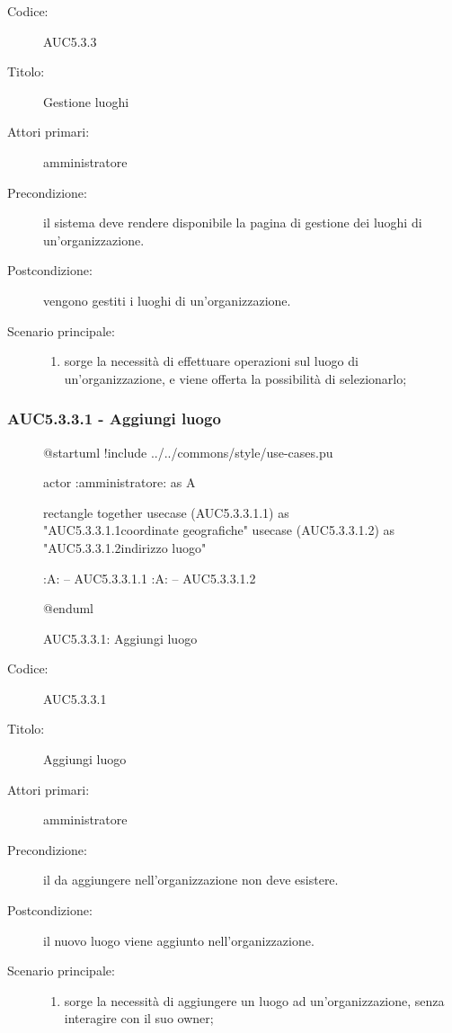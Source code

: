 \documentclass[../../../analisi-dei-requisiti.tex]{subfiles}
\begin{document}
\begin{description}
  \item[Codice:] AUC5.3.3
  \item[Titolo:] Gestione luoghi
  \item[Attori primari:] amministratore
  \item[Precondizione:] il sistema deve rendere disponibile la pagina di gestione dei luoghi di un'organizzazione.
  \item[Postcondizione:] vengono gestiti i luoghi di un'organizzazione.
  \item[Scenario principale:]
  \begin{enumerate}
    \item sorge la necessità di effettuare operazioni sul luogo di un'organizzazione, e viene offerta la possibilità di selezionarlo;
  \end{enumerate}
\end{description}

\subsubsection{AUC5.3.3.1 - Aggiungi luogo}%
\label{subs:AUC5.3.3.1}

\begin{figure}[H]
  \centering
  \begin{plantuml}
  @startuml
  !include ../../commons/style/use-cases.pu

  actor :amministratore: as A

  rectangle {
    together {
      usecase (AUC5.3.3.1.1) as "AUC5.3.3.1.1\nInserisci coordinate geografiche"
      usecase (AUC5.3.3.1.2) as "AUC5.3.3.1.2\nInserisci indirizzo luogo"
    }
  }

  :A: -- AUC5.3.3.1.1
  :A: -- AUC5.3.3.1.2

  @enduml
  \end{plantuml}
  \caption{AUC5.3.3.1: Aggiungi luogo}
  \label{fig:AUC5_3_3_1}
\end{figure}

\begin{description}
  \item[Codice:] AUC5.3.3.1
  \item[Titolo:] Aggiungi luogo
  \item[Attori primari:] amministratore
  \item[Precondizione:] il  da aggiungere nell'organizzazione non deve esistere.
  \item[Postcondizione:] il nuovo luogo viene aggiunto nell'organizzazione.
  \item[Scenario principale:]
  \begin{enumerate}
    \item sorge la necessità di aggiungere un luogo ad un'organizzazione, senza interagire con il suo owner;
  \end{enumerate}
\end{description}
\end{document}
